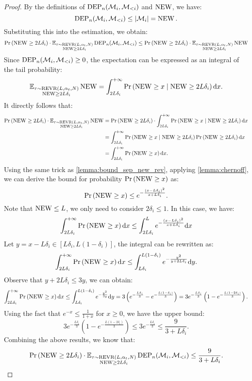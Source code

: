 \begin{proof}
By the definitions of $\operatorname{DEP}_n({\mathcal{M}}_i, {\mathcal{M}}_{<i})$ and $\operatorname{NEW}$, we have:
$$\operatorname{DEP}_n({\mathcal{M}}_i, {\mathcal{M}}_{<i})\leq |{\mathcal{M}}_i|=\operatorname{NEW}.$$
Substituting this into the estimation, we obtain:
$$\Pr\left(\operatorname{NEW}\geq 2L\delta_i\right)\cdot \mathbb{E}_{\substack{\tau \sim \operatorname{REVR}(L, \alpha_t, N)\\ \operatorname{NEW}\geq 2L\delta_i}} \operatorname{DEP}_n({\mathcal{M}}_i, {\mathcal{M}}_{<i})\leq \Pr\left(\operatorname{NEW}\geq 2L\delta_i\right)\cdot \mathbb{E}_{\substack{\tau \sim \operatorname{REVR}(L, \alpha_t, N)\\ \operatorname{NEW}\geq 2L\delta_i}} \operatorname{NEW}$$
Since $\operatorname{DEP}_n({\mathcal{M}}_i, {\mathcal{M}}_{<i})\geq 0$, the expectation can be expressed as an integral of the tail probability:
$$\mathbb{E}_{\substack{\tau \sim \operatorname{REVR}(L, \alpha_t, N)\\ \operatorname{NEW}\geq 2L\delta_i}} \operatorname{NEW}=\int_{2L\delta_i}^{+\infty} \Pr\left(\operatorname{NEW}\geq x\mid\operatorname{NEW}\geq 2L\delta_i\right)\mathrm{d} x.$$
It directly follows that:
\begin{align*}
    \Pr\left(\operatorname{NEW}\geq 2L\delta_i\right)\cdot \mathbb{E}_{\substack{\tau \sim \operatorname{REVR}(L, \alpha_t, N)\\ \operatorname{NEW}\geq 2L\delta_i}} \operatorname{NEW} &=\Pr\left(\operatorname{NEW}\geq 2L\delta_i\right)\cdot \int_{2L\delta_i}^{+\infty} \Pr\left(\operatorname{NEW}\geq x\mid\operatorname{NEW}\geq 2L\delta_i\right)\mathrm{d} x\\
    &=\int_{2L\delta_i}^{+\infty} \Pr\left(\operatorname{NEW}\geq x\mid\operatorname{NEW}\geq 2L\delta_i\right)\Pr\left(\operatorname{NEW}\geq 2L\delta_i\right)\mathrm{d} x\\
    &=\int_{2L\delta_i}^{+\infty}\Pr\left(\operatorname{NEW}\geq x\right)\mathrm{d} x.
\end{align*}
Using the same trick as \cref{lemma:bound_sep_new_rev}, applying \cref{lemma:chernoff}, we can derive the bound for probability $\Pr\left(\operatorname{NEW}\geq x\right)$ as:
$$\Pr\left(\operatorname{NEW}\geq x\right)\leq e^{-\frac{(x-L\delta_i)^2}{x+L\delta_i}}.$$
Note that $\operatorname{NEW}\leq L$, we only need to consider $2\delta_i\leq 1$. In this case, we have:
\begin{align*}
    \int_{2L\delta_i}^{+\infty}\Pr\left(\operatorname{NEW}\geq x\right)\mathrm{d} x \leq \int_{2L\delta_i}^{L}e^{-\frac{(x-L\delta_i)^2}{x+L\delta_i}}\mathrm{d} x
\end{align*}
Let $y=x-L\delta_i\in[L\delta_i,L(1-\delta_i)]$, the integral can be rewritten as:
$$\int_{2L\delta_i}^{+\infty}\Pr\left(\operatorname{NEW}\geq x\right)\mathrm{d} x \leq \int_{L\delta_i}^{L(1-\delta_i)}e^{-\frac{y^2}{y+2L\delta_i}}\mathrm{d} y.$$
Observe that $y+2L\delta_i\leq 3y$, we can obtain:
$$\int_{2L\delta_i}^{+\infty}\Pr\left(\operatorname{NEW}\geq x\right)\mathrm{d} x \leq \int_{L\delta_i}^{L(1-\delta_i)}e^{-\frac{y^2}{3y}}\mathrm{d} y =3\left(e^{-\frac{L\delta_i}{3}}-e^{-\frac{L(1-\delta_i)}{3}}\right)=3e^{-\frac{L\delta_i}{3}}\left(1-e^{-\frac{L(1-2\delta_i)}{3}}\right).$$
Using the fact that $e^{-x}\leq\frac{1}{1+x}$ for $x\geq 0$, we have the upper bound:
$$3e^{-\frac{L\delta_i}{3}}\left(1-e^{-\frac{L(1-2\delta_i)}{3}}\right)\leq 3e^{-\frac{L\delta_i}{3}}\leq \frac{9}{3+L\delta_i}.$$
Combining the above results, we know that:
$$\Pr\left(\operatorname{NEW}\geq 2L\delta_i\right)\cdot \mathbb{E}_{\substack{\tau \sim \operatorname{REVR}(L, \alpha_t, N)\\ \operatorname{NEW}\geq 2L\delta_i}} \operatorname{DEP}_n({\mathcal{M}}_i, {\mathcal{M}}_{<i})\leq \frac{9}{3+L\delta_i}.$$


\end{proof}
